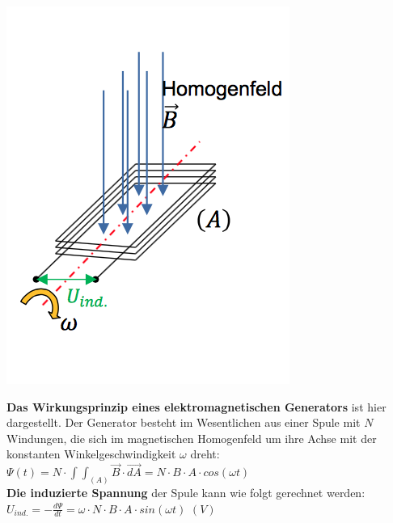 \begin{minipage}{0.2 \linewidth}
    \includegraphics[width =\linewidth]{./Pics/VL1/elGen}
\end{minipage}
\begin{minipage}{0.8 \linewidth}
\textbf{Das Wirkungsprinzip eines elektromagnetischen Generators} ist hier dargestellt. Der Generator besteht im Wesentlichen aus einer Spule mit $N$ Windungen, die sich im magnetischen Homogenfeld um ihre Achse mit der konstanten Winkelgeschwindigkeit $\omega$ dreht:\\

$\Psi (t) = N \cdot \int\int_{(A)} \vec{B} \cdot \vec{dA} = N \cdot B \cdot A \cdot cos(\omega t) $ \\

\textbf{Die induzierte Spannung} der Spule kann wie folgt gerechnet werden: \\

$U_{ind.} = - \frac{d\Psi}{dt} = \omega \cdot N \cdot B \cdot A \cdot sin(\omega t)$  $(V)$
\end{minipage}

